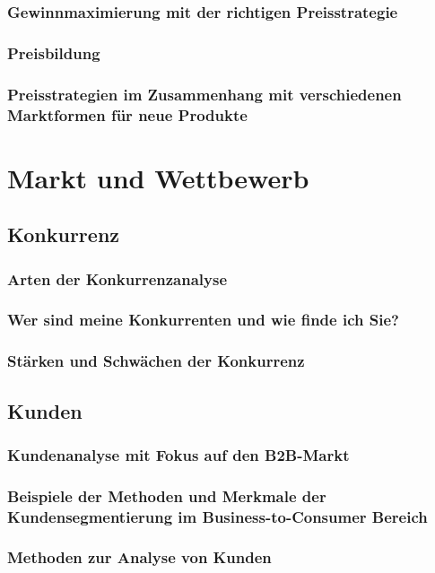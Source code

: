 \subsection{Gewinnmaximierung mit der richtigen Preisstrategie}

\subsection{Preisbildung}

\subsection{Preisstrategien im Zusammenhang mit verschiedenen Marktformen für neue Produkte}

\chapter{Markt und Wettbewerb}
\section{Konkurrenz}
\subsection{Arten der Konkurrenzanalyse}

\subsection{Wer sind meine Konkurrenten und wie finde ich Sie?}

\subsection{Stärken und Schwächen der Konkurrenz}

\section{Kunden}
\subsection{Kundenanalyse mit Fokus auf den B2B-Markt}

\subsection{Beispiele der Methoden und Merkmale der Kundensegmentierung im Business-to-Consumer Bereich}

\subsection{Methoden zur Analyse von Kunden}

